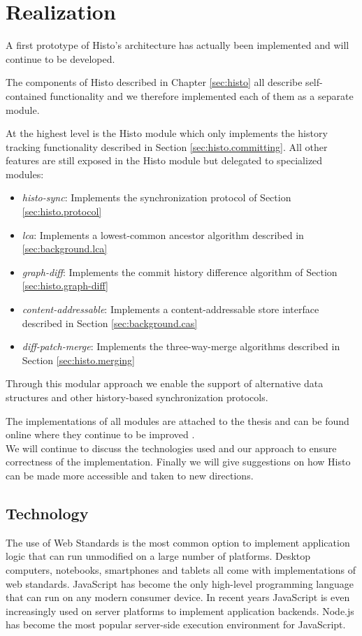 
\chapter{Realization}
\label{sec:realization}
A first prototype of Histo's architecture has actually been implemented and will continue to be developed.

The components of Histo described in Chapter \ref{sec:histo} all describe self-contained functionality and we therefore implemented each of them as a separate module.

At the highest level is the Histo module which only implements the history tracking functionality described in Section \ref{sec:histo.committing}.
All other features are still exposed in the Histo module but delegated to specialized modules:

\begin{itemize}
\item \emph{histo-sync}: Implements the synchronization protocol of Section \ref{sec:histo.protocol}
\item \emph{lca}: Implements a lowest-common ancestor algorithm described in \ref{sec:background.lca}
\item \emph{graph-diff}: Implements the commit history difference algorithm of Section \ref{sec:histo.graph-diff}
\item \emph{content-addressable}: Implements a content-addressable store interface described in Section \ref{sec:background.cas}
\item \emph{diff-patch-merge}: Implements the three-way-merge algorithms described in Section \ref{sec:histo.merging}
\end{itemize}

Through this modular approach we enable the support of alternative data structures and other history-based synchronization protocols.

The implementations of all modules are attached to the thesis and can be found online where they continue to be improved \cite{histo-source}.\\

We will continue to discuss the technologies used and our approach to ensure correctness of the implementation.
Finally we will give suggestions on how Histo can be made more accessible and taken to new directions.

\section{Technology}
The use of Web Standards is the most common option to implement application logic that can run unmodified on a large number of platforms.
Desktop computers, notebooks, smartphones and tablets all come with implementations of web standards.
JavaScript has become the only high-level programming language that can run on any modern consumer device.
In recent years JavaScript is even increasingly used on server platforms to implement application backends.
Node.js has become the most popular server-side execution environment for JavaScript.\\


